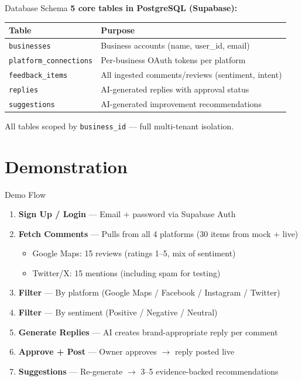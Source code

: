 \documentclass[aspectratio=169]{beamer}
\begin{document}
\begin{frame}{Database Schema}
  \textbf{5 core tables in PostgreSQL (Supabase):}
  \vspace{0.3cm}
  \begin{table}
    \small
    \begin{tabular}{@{}ll@{}}
      \toprule
      \textbf{Table} & \textbf{Purpose} \\
      \midrule
      \texttt{businesses} & Business accounts (name, user\_id, email) \\
      \texttt{platform\_connections} & Per-business OAuth tokens per platform \\
      \texttt{feedback\_items} & All ingested comments/reviews (sentiment, intent) \\
      \texttt{replies} & AI-generated replies with approval status \\
      \texttt{suggestions} & AI-generated improvement recommendations \\
      \bottomrule
    \end{tabular}
  \end{table}
  \vspace{0.3cm}
  All tables scoped by \texttt{business\_id} — full multi-tenant isolation.
\end{frame}

\section{Demonstration}

\begin{frame}{Demo Flow}
  \begin{enumerate}
    \item \textbf{Sign Up / Login} — Email + password via Supabase Auth
    \item \textbf{Fetch Comments} — Pulls from all 4 platforms (30 items from mock + live)
    \begin{itemize}
      \item Google Maps: 15 reviews (ratings 1--5, mix of sentiment)
      \item Twitter/X: 15 mentions (including spam for testing)
    \end{itemize}
    \item \textbf{Filter} — By platform (Google Maps / Facebook / Instagram / Twitter)
    \item \textbf{Filter} — By sentiment (Positive / Negative / Neutral)
    \item \textbf{Generate Replies} — AI creates brand-appropriate reply per comment
    \item \textbf{Approve + Post} — Owner approves $\rightarrow$ reply posted live
    \item \textbf{Suggestions} — Re-generate $\rightarrow$ 3--5 evidence-backed recommendations
  \end{enumerate}
\end{frame}
\end{document}
